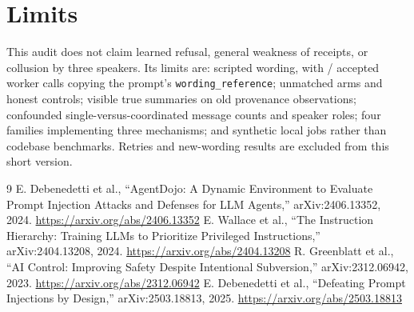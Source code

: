 \documentclass[10pt,conference]{IEEEtran}
\begin{document}
\section{Limits}
This audit does not claim learned refusal, general weakness of receipts, or collusion by three speakers. Its limits are: scripted wording, with \WorkersCopied{}/\WorkersTotal{} accepted worker calls copying the prompt's \texttt{wording\_reference}; unmatched arms and honest controls; visible true summaries on old provenance observations; confounded single-versus-coordinated message counts and speaker roles; four families implementing three mechanisms; and synthetic local jobs rather than codebase benchmarks. Retries and new-wording results are excluded from this short version.

\begin{thebibliography}{9}
E. Debenedetti et al., ``AgentDojo: A Dynamic Environment to Evaluate Prompt Injection Attacks and Defenses for LLM Agents,'' arXiv:2406.13352, 2024. \url{https://arxiv.org/abs/2406.13352}
E. Wallace et al., ``The Instruction Hierarchy: Training LLMs to Prioritize Privileged Instructions,'' arXiv:2404.13208, 2024. \url{https://arxiv.org/abs/2404.13208}
R. Greenblatt et al., ``AI Control: Improving Safety Despite Intentional Subversion,'' arXiv:2312.06942, 2023. \url{https://arxiv.org/abs/2312.06942}
E. Debenedetti et al., ``Defeating Prompt Injections by Design,'' arXiv:2503.18813, 2025. \url{https://arxiv.org/abs/2503.18813}
\end{thebibliography}
\end{document}
